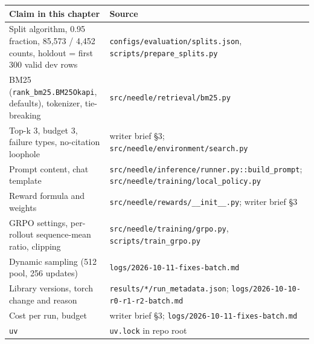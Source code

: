 {\def\LTcaptype{none} %
\begin{longtable}[]{@{}
  >{\raggedright\arraybackslash}p{}
  >{\raggedright\arraybackslash}p{}@{}}
\toprule\noalign{}
\begin{minipage}[b]{\linewidth}\raggedright
Claim in this chapter
\end{minipage} & \begin{minipage}[b]{\linewidth}\raggedright
Source
\end{minipage} \\
\midrule\noalign{}
\endhead
\bottomrule\noalign{}
\endlastfoot
Split algorithm, 0.95 fraction, 85,573 / 4,452 counts, holdout = first
300 valid dev rows &
\texttt{configs/\allowbreak{}evaluation/\allowbreak{}splits.\allowbreak{}json},
\texttt{scripts/\allowbreak{}prepare\_\allowbreak{}splits.\allowbreak{}py} \\
BM25 (\texttt{rank\_\allowbreak{}bm25.\allowbreak{}BM25Okapi},
defaults), tokenizer, tie-breaking &
\texttt{src/\allowbreak{}needle/\allowbreak{}retrieval/\allowbreak{}bm25.\allowbreak{}py} \\
Top-k 3, budget 3, failure types, no-citation loophole & writer brief
§3;
\texttt{src/\allowbreak{}needle/\allowbreak{}environment/\allowbreak{}search.\allowbreak{}py} \\
Prompt content, chat template &
\texttt{src/\allowbreak{}needle/\allowbreak{}inference/\allowbreak{}runner.\allowbreak{}py::build\_\allowbreak{}prompt};
\texttt{src/\allowbreak{}needle/\allowbreak{}training/\allowbreak{}local\_\allowbreak{}policy.\allowbreak{}py} \\
Reward formula and weights &
\texttt{src/\allowbreak{}needle/\allowbreak{}rewards/\allowbreak{}\_\allowbreak{}\_\allowbreak{}init\_\allowbreak{}\_\allowbreak{}.\allowbreak{}py};
writer brief §3 \\
GRPO settings, per-rollout sequence-mean ratio, clipping &
\texttt{src/\allowbreak{}needle/\allowbreak{}training/\allowbreak{}grpo.\allowbreak{}py},
\texttt{scripts/\allowbreak{}train\_\allowbreak{}grpo.\allowbreak{}py} \\
Dynamic sampling (512 pool, 256 updates) &
\texttt{logs/\allowbreak{}2026-\allowbreak{}10-\allowbreak{}11-\allowbreak{}fixes-\allowbreak{}batch.\allowbreak{}md} \\
Library versions, torch change and reason &
\texttt{results/\allowbreak{}*/\allowbreak{}run\_\allowbreak{}metadata.\allowbreak{}json};
\texttt{logs/\allowbreak{}2026-\allowbreak{}10-\allowbreak{}10-\allowbreak{}r0-\allowbreak{}r1-\allowbreak{}r2-\allowbreak{}batch.\allowbreak{}md} \\
Cost per run, budget & writer brief §3;
\texttt{logs/\allowbreak{}2026-\allowbreak{}10-\allowbreak{}11-\allowbreak{}fixes-\allowbreak{}batch.\allowbreak{}md} \\
\texttt{uv} & \texttt{uv.\allowbreak{}lock} in repo root \\
\end{longtable}
}
